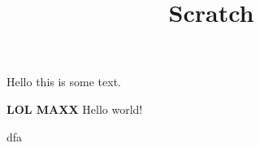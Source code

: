 \documentclass[12pt]{article}
\title{Scratch}
\author{}
\newcommand{\foo}[2][LOL MAXX]{

  \textbf{#1} Hello world!

  #2
}
\begin{document}
\maketitle

Hello this is some text.

\foo{dfa}
\end{document}

